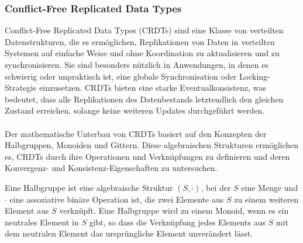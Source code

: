 \documentclass[../vs-script-first-v01.tex]{subfiles}
\begin{document}
\subsubsection{Conflict-Free Replicated Data Types}
Conflict-Free Replicated Data Types (CRDTs) sind eine Klasse von verteilten Datenstrukturen, die es ermöglichen, Replikationen von Daten in verteilten Systemen auf einfache Weise und ohne Koordination zu aktualisieren und zu synchronisieren. Sie sind besonders nützlich in Anwendungen, in denen es schwierig oder unpraktisch ist, eine globale Synchronisation oder Locking-Strategie einzusetzen. CRDTs bieten eine starke Eventualkonsistenz, was bedeutet, dass alle Replikationen des Datenbestands letztendlich den gleichen Zustand erreichen, solange keine weiteren Updates durchgeführt werden.
\\\\
Der mathematische Unterbau von CRDTs basiert auf den Konzepten der Halbgruppen, Monoiden und Gittern. Diese algebraischen Strukturen ermöglichen es, CRDTs durch ihre Operationen und Verknüpfungen zu definieren und deren Konvergenz- und Konsistenz-Eigenschaften zu untersuchen.

Eine Halbgruppe ist eine algebraische Struktur $(S, \cdot)$, bei der $S$ eine Menge und $\cdot$ eine assoziative binäre Operation ist, die zwei Elemente aus $S$ zu einem weiteren Element aus $S$ verknüpft. Eine Halbgruppe wird zu einem Monoid, wenn es ein neutrales Element in $S$ gibt, so dass die Verknüpfung jedes Elements aus $S$ mit dem neutralen Element das ursprüngliche Element unverändert lässt.
\end{document}

